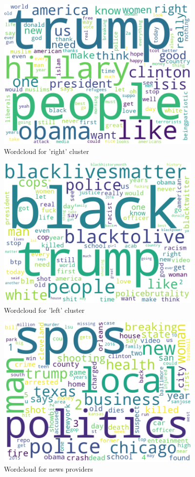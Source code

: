 \documentclass[12pt, authoryear]{elsarticle}
\begin{document}
\begin{figure}[H]
\includegraphics[width=4in]{wordcloud2}
\centering
\caption{Wordcloud for 'right' cluster}
\label{wordcloud:1}
\end{figure}

\begin{figure}[H]
\includegraphics[width=4in]{wordcloud1}
\centering
\caption{Wordcloud for 'left' cluster}
\label{wordcloud:2}
\end{figure}

\begin{figure}[H]
\includegraphics[width=4in]{wordcloud3}
\centering
\caption{Wordcloud for news providers}
\label{wordcloud:3}
\end{figure}
\end{document}
